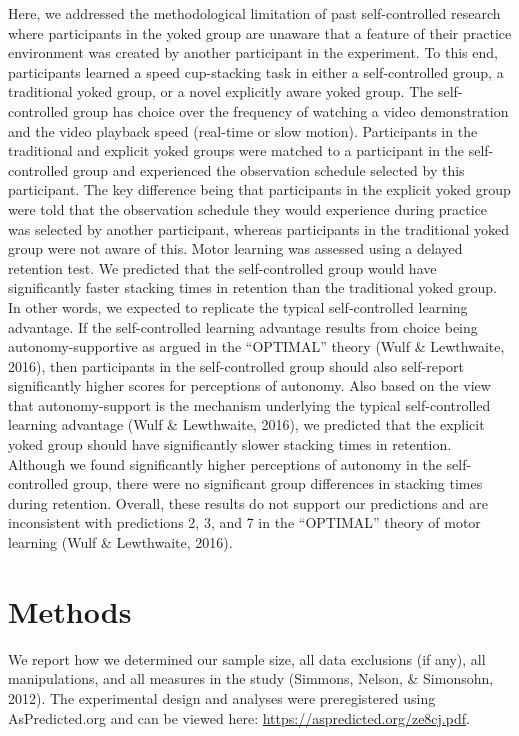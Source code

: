 \documentclass[
  english,
  doc, donotrepeattitle,floatsintext]{apa7}
\begin{document}
Here, we addressed the methodological limitation of past self-controlled research where participants in the yoked group are unaware that a feature of their practice environment was created by another participant in the experiment. To this end, participants learned a speed cup-stacking task in either a self-controlled group, a traditional yoked group, or a novel explicitly aware yoked group. The self-controlled group has choice over the frequency of watching a video demonstration and the video playback speed (real-time or slow motion). Participants in the traditional and explicit yoked groups were matched to a participant in the self-controlled group and experienced the observation schedule selected by this participant. The key difference being that participants in the explicit yoked group were told that the observation schedule they would experience during practice was selected by another participant, whereas participants in the traditional yoked group were not aware of this. Motor learning was assessed using a delayed retention test. We predicted that the self-controlled group would have significantly faster stacking times in retention than the traditional yoked group. In other words, we expected to replicate the typical self-controlled learning advantage. If the self-controlled learning advantage results from choice being autonomy-supportive as argued in the ``OPTIMAL'' theory (Wulf \& Lewthwaite, 2016), then participants in the self-controlled group should also self-report significantly higher scores for perceptions of autonomy. Also based on the view that autonomy-support is the mechanism underlying the typical self-controlled learning advantage (Wulf \& Lewthwaite, 2016), we predicted that the explicit yoked group should have significantly slower stacking times in retention. Although we found significantly higher perceptions of autonomy in the self-controlled group, there were no significant group differences in stacking times during retention. Overall, these results do not support our predictions and are inconsistent with predictions 2, 3, and 7 in the ``OPTIMAL'' theory of motor learning (Wulf \& Lewthwaite, 2016).

\hypertarget{methods}{%
\section{Methods}\label{methods}}

We report how we determined our sample size, all data exclusions (if any), all manipulations, and all measures in the study (Simmons, Nelson, \& Simonsohn, 2012). The experimental design and analyses were preregistered using AsPredicted.org and can be viewed here: \url{https://aspredicted.org/ze8cj.pdf}.
\end{document}
